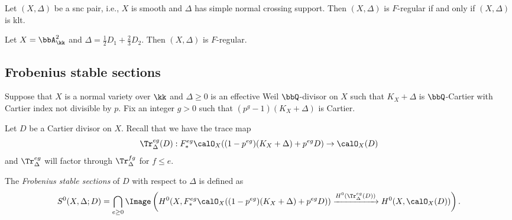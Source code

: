 \begin{remark}
	Let $(X,\Delta)$ be a snc pair, i.e., $X$ is smooth and $\Delta$ has simple normal crossing support.
	Then $(X,\Delta)$ is $F$-regular if and only if $(X,\Delta)$ is klt.
	\Yang{}
\end{remark}

\begin{example}
	Let $X = \bbA^2_\kk$ and $\Delta = \frac{1}{2}D_1 + \frac{2}{3}D_2$.
	Then $(X,\Delta)$ is $F$-regular.
	\Yang{}
\end{example}



\subsection{Frobenius stable sections}

Suppose that $X$ is a normal variety over $\kk$ and $\Delta \geq 0$ is an effective Weil $\bbQ$-divisor on $X$ such that $K_X+\Delta$ is $\bbQ$-Cartier with Cartier index not divisible by $p$.
Fix an integer $g>0$ such that $(p^g-1)(K_X+\Delta)$ is Cartier.

Let $D$ be a Cartier divisor on $X$.
Recall that we have the trace map
\[ \Tr_\Delta^{eg}(D): F^{eg}_* \calO_X((1-p^{eg})(K_X+\Delta)+p^{eg}D) \to \calO_X(D) \]
and $\Tr_\Delta^{eg}$ will factor through $\Tr_\Delta^{fg}$ for $f \leq e$.
\begin{definition}[Frobenius ]
	The \emph{Frobenius stable sections} of $D$ with respect to $\Delta$ is defined as
	\[ S^0(X,\Delta;D) = \bigcap_{e \geq 0} \Image\left( H^0(X, F^{eg}_* \calO_X((1-p^{eg})(K_X+\Delta)+p^{eg}D)) \xrightarrow{H^0(\Tr_\Delta^{eg}(D))} H^0(X, \calO_X(D)) \right). \]
\end{definition}

